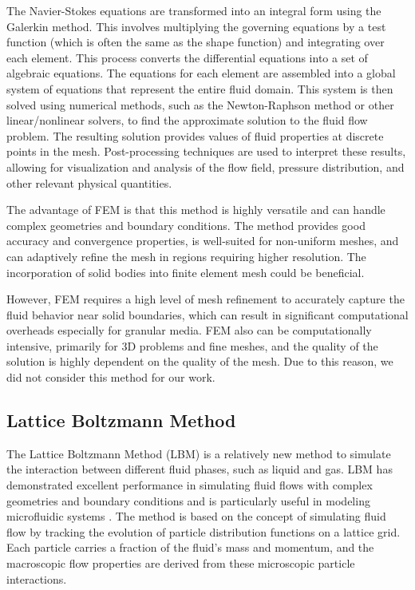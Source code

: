 The Navier-Stokes equations are transformed into an integral form using the Galerkin method. This involves multiplying the governing equations by a test function (which is often the same as the shape function) and integrating over each element. This process converts the differential equations into a set of algebraic equations. The equations for each element are assembled into a global system of equations that represent the entire fluid domain. This system is then solved using numerical methods, such as the Newton-Raphson method or other linear/nonlinear solvers, to find the approximate solution to the fluid flow problem. The resulting solution provides values of fluid properties at discrete points in the mesh. Post-processing techniques are used to interpret these results, allowing for visualization and analysis of the flow field, pressure distribution, and other relevant physical quantities.

The advantage of FEM is that this method is highly versatile and can handle complex geometries and boundary conditions. The method provides good accuracy and convergence properties, is well-suited for non-uniform meshes, and can adaptively refine the mesh in regions requiring higher resolution. The incorporation of solid bodies into finite element mesh could be beneficial.

However, FEM requires a high level of mesh refinement to accurately capture the fluid behavior near solid boundaries, which can result in significant computational overheads \cite{FEM_2} especially for granular media. FEM also can be computationally intensive, primarily for 3D problems and fine meshes, and the quality of the solution is highly dependent on the quality of the mesh. Due to this reason, we did not consider this method for our work.

\subsection{Lattice Boltzmann Method}
 
The Lattice Boltzmann Method (LBM)\cite{begum2008lattice} is a relatively new method to simulate the interaction between different fluid phases, such as liquid and gas. LBM has demonstrated excellent performance in simulating fluid flows with complex geometries and boundary conditions and is particularly useful in modeling microfluidic systems \cite{aidun2010lattice}. The method is based on the concept of simulating fluid flow by tracking the evolution of particle distribution functions on a lattice grid. Each particle carries a fraction of the fluid's mass and momentum, and the macroscopic flow properties are derived from these microscopic particle interactions.


